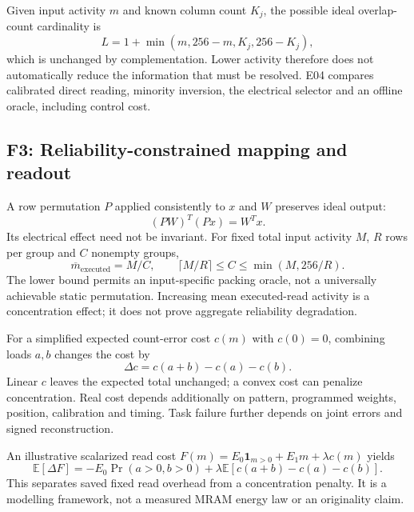 Given input activity $m$ and known column count $K_j$, the possible ideal overlap-count
cardinality is
\begin{equation}
 L=1+\min(m,256-m,K_j,256-K_j),
\end{equation}
which is unchanged by complementation. Lower activity therefore does not automatically
reduce the information that must be resolved. E04 compares calibrated direct reading,
minority inversion, the electrical selector and an offline oracle, including control cost.

\subsection{F3: Reliability-constrained mapping and readout}

A row permutation $P$ applied consistently to $x$ and $W$ preserves ideal output:
\begin{equation}
 (PW)^T(Px)=W^Tx.
\end{equation}
Its electrical effect need not be invariant. For fixed total input activity $M$, $R$ rows
per group and $C$ nonempty groups,
\begin{equation}
 \overline m_{\mathrm{executed}}=M/C,\qquad
 \lceil M/R\rceil\le C\le\min(M,256/R).
\end{equation}
The lower bound permits an input-specific packing oracle, not a universally achievable
static permutation. Increasing mean executed-read activity is a concentration effect;
it does not prove aggregate reliability degradation.

For a simplified expected count-error cost $c(m)$ with $c(0)=0$, combining loads $a,b$
changes the cost by
\begin{equation}
 \Delta c=c(a+b)-c(a)-c(b).
\end{equation}
Linear $c$ leaves the expected total unchanged; a convex cost can penalize concentration.
Real cost depends additionally on pattern, programmed weights, position, calibration and
timing. Task failure further depends on joint errors and signed reconstruction.

An illustrative scalarized read cost $F(m)=E_0\mathbf1_{m>0}+E_1m+\lambda c(m)$ yields
\begin{equation}
 \mathbb E[\Delta F]=-E_0\Pr(a>0,b>0)
 +\lambda\mathbb E[c(a+b)-c(a)-c(b)].
\end{equation}
This separates saved fixed read overhead from a concentration penalty. It is a modelling
framework, not a measured MRAM energy law or an originality claim.

